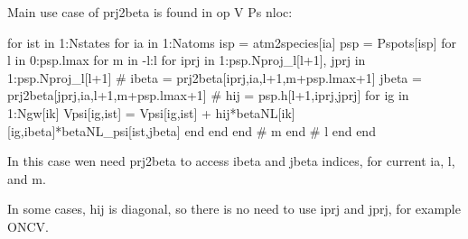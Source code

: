Main use case of prj2beta is found in op V Ps nloc:
\begin{juliacode}
for ist in 1:Nstates
    for ia in 1:Natoms
        isp = atm2species[ia]
        psp = Pspots[isp]
        for l in 0:psp.lmax
        for m in -l:l
            for iprj in 1:psp.Nproj_l[l+1], jprj in 1:psp.Nproj_l[l+1]
                #
                ibeta = prj2beta[iprj,ia,l+1,m+psp.lmax+1]
                jbeta = prj2beta[jprj,ia,l+1,m+psp.lmax+1]
                #
                hij = psp.h[l+1,iprj,jprj]
                for ig in 1:Ngw[ik]
                    Vpsi[ig,ist] = Vpsi[ig,ist] + hij*betaNL[ik][ig,ibeta]*betaNL_psi[ist,jbeta]
                end
            end
        end # m
        end # l
    end
end
\end{juliacode}

In this case wen need prj2beta to access ibeta and jbeta indices, for current ia, l, and m.

In some cases, hij is diagonal, so there is no need to use iprj and jprj, for example ONCV.



